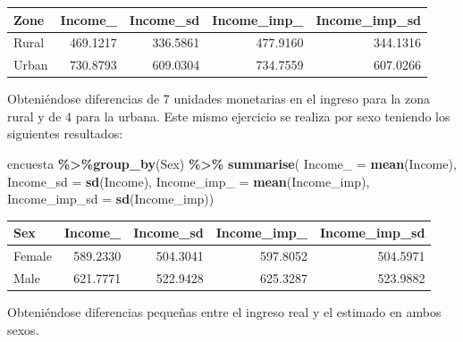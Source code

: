 \documentclass[
  12pt,
]{book}
\newenvironment{Shaded}{\begin{snugshade}}{\end{snugshade}}
\newcommand{\AttributeTok}[1]{\textcolor[rgb]{0.13,0.29,0.53}{#1}}
\newcommand{\FunctionTok}[1]{\textcolor[rgb]{0.13,0.29,0.53}{\textbf{#1}}}
\newcommand{\NormalTok}[1]{#1}
\newcommand{\SpecialCharTok}[1]{\textcolor[rgb]{0.81,0.36,0.00}{\textbf{#1}}}
\begin{document}
\begin{tabular}{l|r|r|r|r}
\hline
Zone & Income\_ & Income\_sd & Income\_imp\_ & Income\_imp\_sd\\
\hline
Rural & 469.1217 & 336.5861 & 477.9160 & 344.1316\\
\hline
Urban & 730.8793 & 609.0304 & 734.7559 & 607.0266\\
\hline
\end{tabular}

Obteniéndose diferencias de 7 unidades monetarias en el ingreso para la zona rural y de 4 para la urbana. Este mismo ejercicio se realiza por sexo teniendo los siguientes resultados:

\begin{Shaded}
\begin{Highlighting}[]
\NormalTok{encuesta }\SpecialCharTok{\%\textgreater{}\%}\FunctionTok{group\_by}\NormalTok{(Sex) }\SpecialCharTok{\%\textgreater{}\%}  \FunctionTok{summarise}\NormalTok{(}
  \AttributeTok{Income\_ =} \FunctionTok{mean}\NormalTok{(Income),}
  \AttributeTok{Income\_sd =} \FunctionTok{sd}\NormalTok{(Income),}
  \AttributeTok{Income\_imp\_ =} \FunctionTok{mean}\NormalTok{(Income\_imp),}
  \AttributeTok{Income\_imp\_sd =} \FunctionTok{sd}\NormalTok{(Income\_imp))}
\end{Highlighting}
\end{Shaded}

\begin{tabular}{l|r|r|r|r}
\hline
Sex & Income\_ & Income\_sd & Income\_imp\_ & Income\_imp\_sd\\
\hline
Female & 589.2330 & 504.3041 & 597.8052 & 504.5971\\
\hline
Male & 621.7771 & 522.9428 & 625.3287 & 523.9882\\
\hline
\end{tabular}

Obteniéndose diferencias pequeñas entre el ingreso real y el estimado en ambos sexos.
\end{document}
